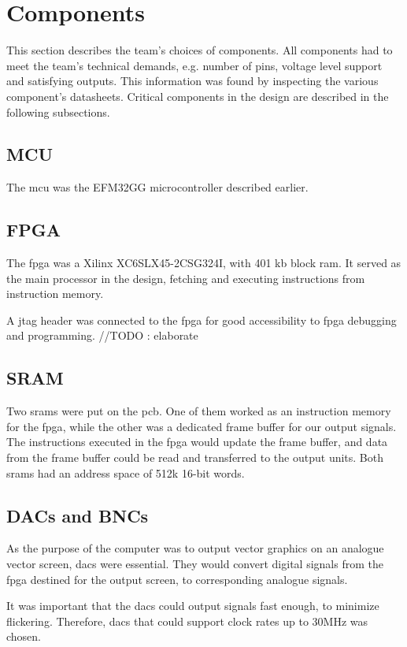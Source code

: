 \section{Components}
This section describes the team's choices of components.
All components had to meet the team's technical demands, e.g. number of pins, voltage level support and satisfying outputs.
This information was found by inspecting the various component's datasheets.
Critical components in the design are described in the following subsections.

\subsection{MCU}
The \gls{mcu} was the EFM32GG microcontroller described earlier.

\subsection{FPGA}
The \gls{fpga} was a Xilinx XC6SLX45-2CSG324I, with 401 kb block \gls{ram}.
It served as the main processor in the design, fetching and executing instructions from instruction memory.

A \gls{jtag} header was connected to the \gls{fpga} for good accessibility to \gls{fpga} debugging and programming.
//TODO : elaborate

\subsection{SRAM}
Two \gls{sram}s were put on the \gls{pcb}.
One of them worked as an instruction memory for the \gls{fpga}, while the other was a dedicated frame buffer for our output signals.
The instructions executed in the \gls{fpga} would update the frame buffer, and data from the frame buffer could be read and transferred to the output units.
Both \gls{sram}s had an address space of 512k 16-bit words.

\subsection{DACs and BNCs}
As the purpose of the computer was to output vector graphics on an analogue vector screen, \gls{dac}s were essential.
They would convert digital signals from the \gls{fpga} destined for the output screen, to corresponding analogue signals.

It was important that the \gls{dac}s could output signals fast enough, to minimize flickering.
Therefore, \gls{dac}s that could support clock rates up to 30MHz was chosen.

